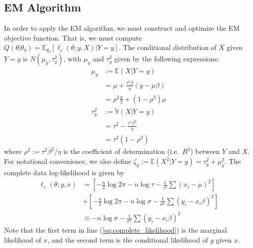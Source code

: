 \documentclass[11pt, oneside]{article}   	%
\newcommand{\bV}{\mathbb{V}}
\newcommand{\bE}{\mathbb{E}}
\begin{document}
\begin{appendices}
    \subsection{EM Algorithm}

    In order to apply the EM algorithm, we must construct and optimize the EM objective function. That is, we must compute $Q(\theta|\theta_0) = \bE_{\theta_0} \left[ \ell_c(\theta; y, X) | Y=y \right]$. The conditional distribution of $X$ given $Y=y$ is $N(\mu_y, \tau^2_y)$, with $\mu_y$ and $\tau^2_y$ given by the following expressions:
	\begin{align}
		\mu_y & := \bE (X | Y=y)\\
		&= \mu + \frac{\tau^2 \beta}{\eta} (y - \mu \beta)\\
		&= \rho^2 \frac{y}{\beta} + (1-\rho^2) \mu\\
		\tau^2_y &:= \bV (X | Y=y)\\
		&= \tau^2 - \frac{\tau^4 \beta^2}{\eta}\\
		&= \tau^2 (1 - \rho^2)
	\end{align}
    where $\rho^2 := \tau^2 \beta^2 / \eta$ is the coefficient of determination (i.e.\ $R^2$) between $Y$ and $X$. For notational convenience, we also define $\zeta_y := \bE(X^2 | Y=y) = \tau_y^2 + \mu_y^2$. The complete data log-likelihood is given by
    \begin{align}
        \ell_c(\theta; y, x) &= \left[ - \frac{n}{2} \log 2 \pi - n \log \tau - \frac{1}{\tau^2} \sum (x_i - \mu)^2 \right] \nonumber\\
        & + \left[ - \frac{n}{2} \log 2\pi - n \log \sigma - \frac{1}{\sigma^2} \sum (y_i - x_i \beta)^2 \right] \label{eq:complete_likelihood}\\
        &\equiv -n \log \sigma - \frac{1}{\sigma^2} \sum (y_i - x_i \beta)^2
    \end{align}
    Note that the first term in line (\ref{eq:complete_likelihood}) is the marginal likelihood of $x$, and the second term is the conditional likelihood of $y$ given $x$.
    

\end{appendices}
\end{document}
